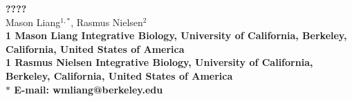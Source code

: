 \usepackage{graphicx,amsmath}
\usepackage{amssymb}

\usepackage{cite}

\usepackage{hyperref}

\usepackage{lineno}

\usepackage{microtype}





\topmargin 0.0cm
\oddsidemargin 0.5cm
\evensidemargin 0.5cm
\textwidth 16cm 
\textheight 21cm

\usepackage[labelfont=bf,labelsep=period,justification=raggedright]{caption}



\makeatletter
\renewcommand{\@biblabel}[1]{\quad#1.}
\makeatother


\date{}

\pagestyle{myheadings}






\begin{flushleft}
{\Large
\textbf{????}
}
\\
Mason Liang$^{1,\ast}$, 
Rasmus Nielsen$^{2}$
\\
\bf{1} Mason Liang Integrative Biology, University of California, Berkeley, California, United States of America
\\
\bf{1} Rasmus Nielsen Integrative Biology, University of California, Berkeley, California, United States of America
\\
$\ast$ E-mail: wmliang@berkeley.edu
\end{flushleft}

